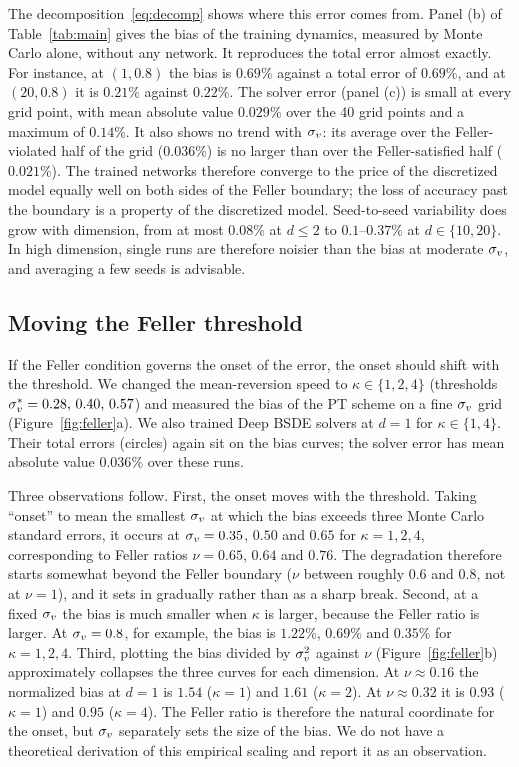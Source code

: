 The decomposition~\eqref{eq:decomp} shows where this error comes from. Panel (b) of Table~\ref{tab:main} gives the bias of the training dynamics, measured by Monte Carlo alone, without any network. It reproduces the total error almost exactly. For instance, at $(1,0.8)$ the bias is $0.69\%$ against a total error of $0.69\%$, and at $(20,0.8)$ it is $0.21\%$ against $0.22\%$. The solver error (panel (c)) is small at every grid point, with mean absolute value $0.029\%$ over the 40 grid points and a maximum of $0.14\%$. It also shows no trend with $\sigma_v$: its average over the Feller-violated half of the grid ($0.036\%$) is no larger than over the Feller-satisfied half ($0.021\%$). The trained networks therefore converge to the price of the discretized model equally well on both sides of the Feller boundary; the loss of accuracy past the boundary is a property of the discretized model. Seed-to-seed variability does grow with dimension, from at most $0.08\%$ at $d\le2$ to $0.1$--$0.37\%$ at $d\in\{10,20\}$. In high dimension, single runs are therefore noisier than the bias at moderate $\sigma_v$, and averaging a few seeds is advisable.

\figFeller
\subsection{Moving the Feller threshold}\label{sec:fellershift}
If the Feller condition governs the onset of the error, the onset should shift with the threshold. We changed the mean-reversion speed to $\kappa\in\{1,2,4\}$ (thresholds $\sigma_v^*=0.28,\,0.40,\,0.57$) and measured the bias of the PT scheme on a fine $\sigma_v$ grid (Figure~\ref{fig:feller}a). We also trained Deep BSDE solvers at $d=1$ for $\kappa\in\{1,4\}$. Their total errors (circles) again sit on the bias curves; the solver error has mean absolute value $0.036\%$ over these runs.

Three observations follow. First, the onset moves with the threshold. Taking ``onset'' to mean the smallest $\sigma_v$ at which the bias exceeds three Monte Carlo standard errors, it occurs at $\sigma_v=0.35$, $0.50$ and $0.65$ for $\kappa=1,2,4$, corresponding to Feller ratios $\nu=0.65$, $0.64$ and $0.76$. The degradation therefore starts somewhat beyond the Feller boundary ($\nu$ between roughly $0.6$ and $0.8$, not at $\nu=1$), and it sets in gradually rather than as a sharp break. Second, at a fixed $\sigma_v$ the bias is much smaller when $\kappa$ is larger, because the Feller ratio is larger. At $\sigma_v=0.8$, for example, the bias is $1.22\%$, $0.69\%$ and $0.35\%$ for $\kappa=1,2,4$. Third, plotting the bias divided by $\sigma_v^2$ against $\nu$ (Figure~\ref{fig:feller}b) approximately collapses the three curves for each dimension. At $\nu\approx0.16$ the normalized bias at $d=1$ is $1.54$ ($\kappa=1$) and $1.61$ ($\kappa=2$). At $\nu\approx0.32$ it is $0.93$ ($\kappa=1$) and $0.95$ ($\kappa=4$). The Feller ratio is therefore the natural coordinate for the onset, but $\sigma_v$ separately sets the size of the bias. We do not have a theoretical derivation of this empirical scaling and report it as an observation.

